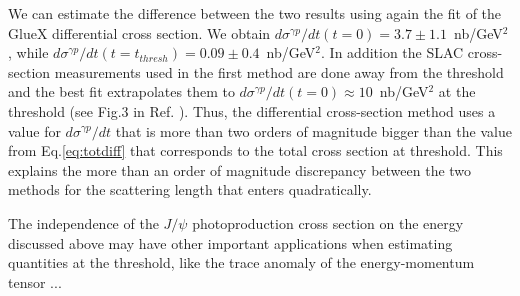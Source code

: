 \documentclass[%
preprint,
nofootinbib,
 amsmath,amssymb,
 aps,
floatfix,
]{revtex4-1}
\begin{document}
We can estimate the difference between the two results using again the fit of the GlueX differential cross
section. We obtain $d\sigma^{\gamma p}/dt (t=0) = 3.7 \pm 1.1$~nb/GeV$^2$, 
while $d\sigma^{\gamma p}/dt (t=t_{thresh}) = 0.09 \pm 0.4$~nb/GeV$^2$.
In addition the SLAC cross-section measurements used in the first method
are done away from the threshold and the best fit 
extrapolates them to $d\sigma^{\gamma p}/dt (t=0) \approx 10$~nb/GeV$^2$ at the threshold
(see Fig.3 in Ref. \cite{Vanderhaeghen_jpsi}).
Thus, the differential cross-section method uses a value for $d\sigma^{\gamma p}/dt$ 
that is more than two orders of magnitude bigger than the value from Eq.\ref{eq:totdiff}
that corresponds to the total cross section at threshold. This explains the more than an order
of magnitude discrepancy between the two methods for the scattering length that enters quadratically.
 
The independence of the $J/\psi $ photoproduction cross section on the energy
discussed above may have other important applications when estimating quantities at the threshold, 
like the trace anomaly of the energy-momentum tensor ...







\end{document}
